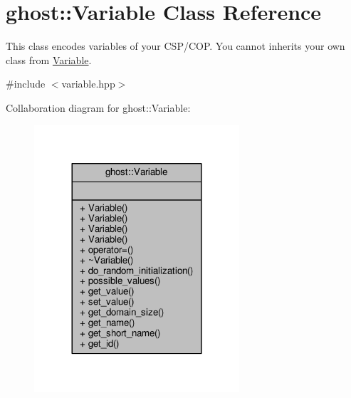 \hypertarget{classghost_1_1Variable}{}\section{ghost\+:\+:Variable Class Reference}
\label{classghost_1_1Variable}


This class encodes variables of your C\+S\+P/\+C\+OP. You cannot inherits your own class from \hyperlink{classghost_1_1Variable}{Variable}.  




{\ttfamily \#include $<$variable.\+hpp$>$}



Collaboration diagram for ghost\+:\+:Variable\+:\nopagebreak
\begin{figure}[H]
\begin{center}
\leavevmode
\includegraphics[width=216pt]{classghost_1_1Variable__coll__graph}
\end{center}
\end{figure}
